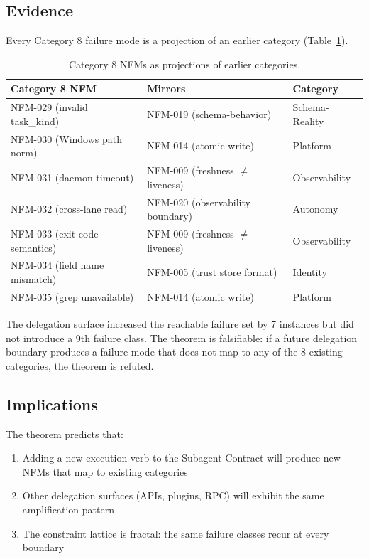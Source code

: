 \documentclass[11pt,letterpaper]{article}
\begin{document}
\subsection{Evidence}

Every Category 8 failure mode is a projection of an earlier category (Table~\ref{tab:amplification}).

\begin{table}[h]
\centering
\caption{Category 8 NFMs as projections of earlier categories.}
\label{tab:amplification}
\begin{tabular}{lll}
\toprule
\textbf{Category 8 NFM} & \textbf{Mirrors} & \textbf{Category} \\
\midrule
NFM-029 (invalid task\_kind) & NFM-019 (schema-behavior) & Schema-Reality \\
NFM-030 (Windows path norm) & NFM-014 (atomic write) & Platform \\
NFM-031 (daemon timeout) & NFM-009 (freshness $\neq$ liveness) & Observability \\
NFM-032 (cross-lane read) & NFM-020 (observability boundary) & Autonomy \\
NFM-033 (exit code semantics) & NFM-009 (freshness $\neq$ liveness) & Observability \\
NFM-034 (field name mismatch) & NFM-005 (trust store format) & Identity \\
NFM-035 (grep unavailable) & NFM-014 (atomic write) & Platform \\
\bottomrule
\end{tabular}
\end{table}

The delegation surface increased the reachable failure set by 7 instances but did not introduce a 9th failure class. The theorem is falsifiable: if a future delegation boundary produces a failure mode that does not map to any of the 8 existing categories, the theorem is refuted.

\subsection{Implications}

The theorem predicts that:
\begin{enumerate}[nosep]
  \item Adding a new execution verb to the Subagent Contract will produce new NFMs that map to existing categories
  \item Other delegation surfaces (APIs, plugins, RPC) will exhibit the same amplification pattern
  \item The constraint lattice is fractal: the same failure classes recur at every boundary
\end{enumerate}
\end{document}
